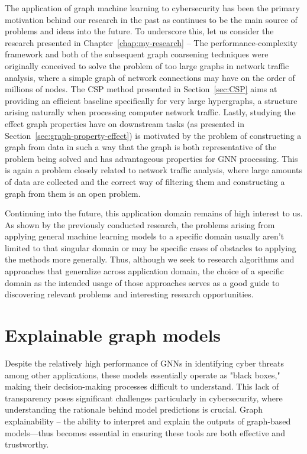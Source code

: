 The application of graph machine learning to cybersecurity has been the primary motivation behind our research in the past as continues to be the main source of problems and ideas into the future. To underscore this, let us consider the research presented in Chapter~\ref{chap:my-research} -- The performance-complexity framework and both of the subsequent graph coarsening techniques were originally conceived to solve the problem of too large graphs in network traffic analysis, where a simple graph of network connections may have on the order of millions of nodes. The CSP method presented in Section~\ref{sec:CSP} aims at providing an efficient baseline specifically for very large hypergraphs, a structure arising naturally when processing computer network traffic. Lastly, studying the effect graph properties have on downstream tasks (as presented in Section~\ref{sec:graph-property-effect}) is motivated by the problem of constructing a graph from data in such a way that the graph is both representative of the problem being solved and has advantageous properties for GNN processing. This is again a problem closely related to network traffic analysis, where large amounts of data are collected and the correct way of filtering them and constructing a graph from them is an open problem.


Continuing into the future, this application domain remains of high interest to us. As shown by the previously conducted research, the problems arising from applying general machine learning models to a specific domain usually aren't limited to that singular domain or may be specific cases of obstacles to applying the methods more generally. Thus, although we seek to research algorithms and approaches that generalize across application domain, the choice of a specific domain as the intended usage of those approaches serves as a good guide to discovering relevant problems and interesting research opportunities.

\section{Explainable graph models}
\label{sec:graph-explainability}

Despite the relatively high performance of GNNs in identifying cyber threats among other applications, these models essentially operate as "black boxes," making their decision-making processes difficult to understand. This lack of transparency poses significant challenges particularly in cybersecurity, where understanding the rationale behind model predictions is crucial. Graph explainability -- the ability to interpret and explain the outputs of graph-based models—thus becomes essential in ensuring these tools are both effective and trustworthy.

